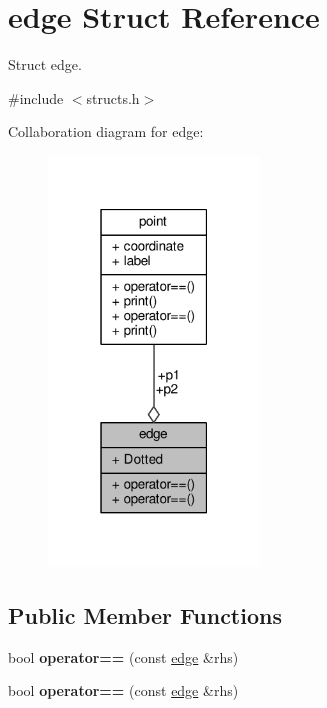 \hypertarget{structedge}{}\section{edge Struct Reference}
\label{structedge}


Struct edge.  




{\ttfamily \#include $<$structs.\+h$>$}



Collaboration diagram for edge\+:
\nopagebreak
\begin{figure}[H]
\begin{center}
\leavevmode
\includegraphics[width=159pt]{structedge__coll__graph}
\end{center}
\end{figure}
\subsection*{Public Member Functions}
\begin{DoxyCompactItemize}
\item 
bool {\bfseries operator==} (const \hyperlink{structedge}{edge} \&rhs)\hypertarget{structedge_a7efc495182c57028f56d1b37394907e2}{}\label{structedge_a7efc495182c57028f56d1b37394907e2}

\item 
bool {\bfseries operator==} (const \hyperlink{structedge}{edge} \&rhs)\hypertarget{structedge_a7efc495182c57028f56d1b37394907e2}{}\label{structedge_a7efc495182c57028f56d1b37394907e2}

\end{DoxyCompactItemize}

